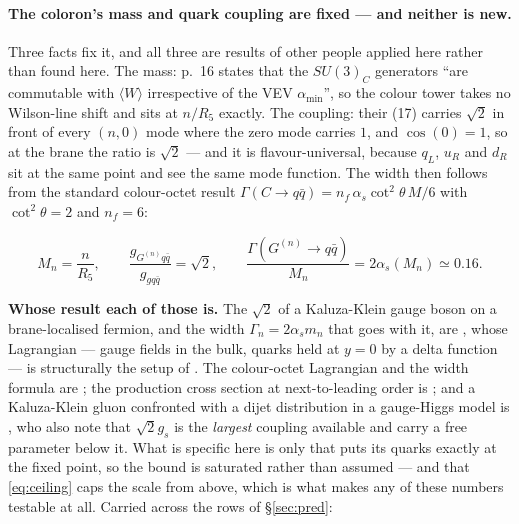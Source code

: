 \documentclass[11pt,a4paper]{article}
\newcommand{\su}[1]{SU(#1)}
\newenvironment{keyeq}
  {\begin{center}\setlength{\fboxsep}{9pt}\setlength{\fboxrule}{0.8pt}%
   \begin{lrbox}{\keyeqbox}\begin{minipage}{0.88\textwidth}}
  {\end{minipage}\end{lrbox}%
   \fcolorbox{hdrblue!55}{hdrblue!6}{\usebox{\keyeqbox}}\end{center}}
\begin{document}
\paragraph{The coloron's mass and quark coupling are fixed --- and neither is new.} Three facts fix
it, and all three are results of other people applied here rather than found here. The mass: \cite{KM25} p.~16
states that the $\su3_C$ generators ``are commutable with $\langle W\rangle$ irrespective of the
VEV $\alpha_{\min}$'', so the colour tower takes no Wilson-line shift and sits at $n/R_5$ exactly.
The coupling: their (17) carries $\sqrt2$ in front of every $(n,0)$ mode where the zero mode
carries $1$, and $\cos(0)=1$, so at the brane the ratio is $\sqrt2$ --- and it is
flavour-universal, because $q_L$, $u_R$ and $d_R$ sit at the same point and see the same mode
function. The width then follows from the standard colour-octet result
$\Gamma(C\to q\bar q)=n_f\,\alpha_s\cot^2\theta\,M/6$ with $\cot^2\theta=2$ and $n_f=6$:

\begin{keyeq}
\begin{equation}\label{eq:coloron}
  M_n=\frac{n}{R_5},
  \qquad
  \frac{g_{G^{(n)}q\bar q}}{g_{gq\bar q}}=\sqrt2,
  \qquad
  \frac{\Gamma(G^{(n)}\!\to q\bar q)}{M_n}=2\alpha_s(M_n)\simeq0.16 .
\end{equation}
\end{keyeq}

\noindent \textbf{Whose result each of those is.} The $\sqrt2$ of a Kaluza-Klein gauge boson
on a brane-localised fermion, and the width $\Gamma_n=2\alpha_s m_n$ that goes with it, are
\cite{DMN01}, whose Lagrangian --- gauge fields in the bulk, quarks held at $y=0$ by a delta
function --- is structurally the setup of \cite{KM25}. The colour-octet Lagrangian and the width
formula are \cite{Simmons97}; the production cross section at next-to-leading order is
\cite{Chivukula13}; and a Kaluza-Klein gluon confronted with a dijet distribution in a
gauge-Higgs model is \cite{KS16}, who also note that $\sqrt2 g_s$ is the \emph{largest} coupling
available and carry a free parameter below it. What is specific here is only that
\cite{KM25} puts its quarks exactly at the fixed point, so the bound is saturated rather than
assumed --- and that \eqref{eq:ceiling} caps the scale from above, which is what makes any of
these numbers testable at all. Carried across the rows of \S\ref{sec:pred}:
\end{document}
